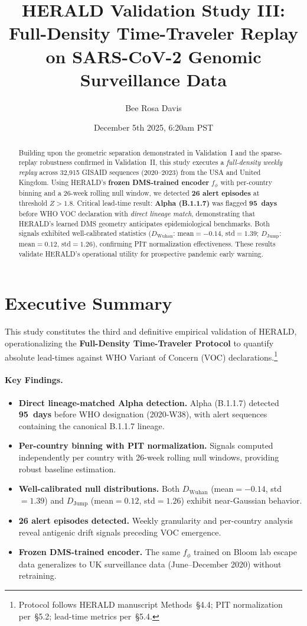 \documentclass[11pt]{article}
\title{HERALD Validation Study III: Full-Density Time-Traveler Replay on SARS-CoV-2 Genomic Surveillance Data}
\author{Bee Rosa Davis}
\date{December 5th 2025, 6:20am PST}
\begin{document}
\maketitle

\begin{abstract}
Building upon the geometric separation demonstrated in Validation~I and the sparse-replay robustness confirmed in Validation~II, this study executes a \emph{full-density weekly replay} across 32,915 GISAID sequences (2020--2023) from the USA and United Kingdom. Using HERALD's \textbf{frozen DMS-trained encoder} $f_{\phi}$ with per-country binning and a 26-week rolling null window, we detected \textbf{26 alert episodes} at threshold $Z>1.8$. Critical lead-time result: \textbf{Alpha (B.1.1.7)} was flagged \textbf{95~days} before WHO VOC declaration with \emph{direct lineage match}, demonstrating that HERALD's learned DMS geometry anticipates epidemiological benchmarks. Both signals exhibited well-calibrated statistics ($D_{\text{Wuhan}}$: mean$=-0.14$, std$=1.39$; $D_{\text{Jump}}$: mean$=0.12$, std$=1.26$), confirming PIT normalization effectiveness. These results validate HERALD's operational utility for prospective pandemic early warning.
\end{abstract}

\section{Executive Summary}
This study constitutes the third and definitive empirical validation of HERALD, operationalizing the \textbf{Full-Density Time-Traveler Protocol} to quantify absolute lead-times against WHO Variant of Concern (VOC) declarations.\footnote{Protocol follows HERALD manuscript Methods~\S4.4; PIT normalization per~\S5.2; lead-time metrics per~\S5.4.}

\paragraph{Key Findings.}
\begin{itemize}[leftmargin=1.1em]
  \item \textbf{Direct lineage-matched Alpha detection.} Alpha (B.1.1.7) detected \textbf{95~days} before WHO designation (2020-W38), with alert sequences containing the canonical B.1.1.7 lineage.
  \item \textbf{Per-country binning with PIT normalization.} Signals computed independently per country with 26-week rolling null windows, providing robust baseline estimation.
  \item \textbf{Well-calibrated null distributions.} Both $D_{\text{Wuhan}}$ (mean$=-0.14$, std$=1.39$) and $D_{\text{Jump}}$ (mean$=0.12$, std$=1.26$) exhibit near-Gaussian behavior.
  \item \textbf{26 alert episodes detected.} Weekly granularity and per-country analysis reveal antigenic drift signals preceding VOC emergence.
  \item \textbf{Frozen DMS-trained encoder.} The same $f_{\phi}$ trained on Bloom lab escape data generalizes to UK surveillance data (June--December 2020) without retraining.
\end{itemize}
\end{document}
